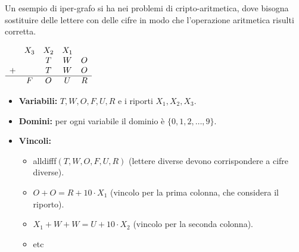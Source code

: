 \documentclass[a4paper,11pt]{report}
\begin{document}
\begin{gframe}{}
Un esempio di iper-grafo si ha nei problemi di cripto-aritmetica, dove bisogna sostituire delle lettere con delle cifre in modo che l'operazione aritmetica risulti corretta.

\begin{center}
$\begin{array}{c@{\quad}c@{\quad}c@{\quad}c@{\quad}c}
    & X_3 & X_2 & X_1 &   \\
    &     & T   & W   & O \\
  + &     & T   & W   & O \\
  \hline
    & F   & O   & U   & R
\end{array}$
\end{center}

\begin{itemize}
    \item \textbf{Variabili:} $T, W, O, F, U, R$ e i riporti $X_1, X_2, X_3$.
    \item \textbf{Domini:} per ogni variabile il dominio è $\{0, 1, 2, \dots, 9\}$.
    \item \textbf{Vincoli:}
    \begin{itemize}
        \item alldifff$(T, W, O, F, U, R)$ (lettere diverse devono corrispondere a cifre diverse).
        \item $O + O = R + 10 \cdot X_1$ (vincolo per la prima colonna, che considera il riporto).
        \item $X_1 + W + W = U + 10 \cdot X_2$ (vincolo per la seconda colonna).
        \item etc
    \end{itemize}
\end{itemize}

\vspace{0.5cm}
\begin{center}
\end{center}
\end{gframe}
\end{document}
